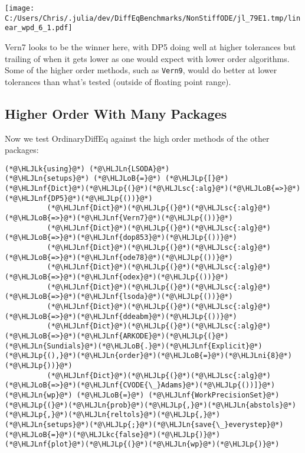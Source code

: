 \documentclass[12pt,a4paper]{article}
\newcommand{\HLJLk}[1]{\textcolor[RGB]{148,91,176}{\textbf{#1}}}
\newcommand{\HLJLkc}[1]{\textcolor[RGB]{59,151,46}{\textit{#1}}}
\newcommand{\HLJLn}[1]{#1}
\newcommand{\HLJLnf}[1]{\textcolor[RGB]{66,102,213}{#1}}
\newcommand{\HLJLsc}[1]{\textcolor[RGB]{201,61,57}{#1}}
\newcommand{\HLJLni}[1]{\textcolor[RGB]{59,151,46}{#1}}
\newcommand{\HLJLoB}[1]{\textcolor[RGB]{102,102,102}{\textbf{#1}}}
\newcommand{\HLJLp}[1]{#1}
\begin{document}
\texttt{[image: C:/Users/Chris/.julia/dev/DiffEqBenchmarks/NonStiffODE/jl\_79E1.tmp/linear\_wpd\_6\_1.pdf]}

Vern7 looks to be the winner here, with DP5 doing well at higher tolerances but trailing of when it gets lower as one would expect with lower order algorithms. Some of the higher order methods, such as \texttt{Vern9}, would do better at lower tolerances than what's tested (outside of floating point range).

\subsection{Higher Order With Many Packages}
Now we test OrdinaryDiffEq against the high order methods of the other packages:


\begin{lstlisting}
(*@\HLJLk{using}@*) (*@\HLJLn{LSODA}@*)
(*@\HLJLn{setups}@*) (*@\HLJLoB{=}@*) (*@\HLJLp{[}@*)(*@\HLJLnf{Dict}@*)(*@\HLJLp{(}@*)(*@\HLJLsc{:alg}@*)(*@\HLJLoB{=>}@*)(*@\HLJLnf{DP5}@*)(*@\HLJLp{())}@*)
          (*@\HLJLnf{Dict}@*)(*@\HLJLp{(}@*)(*@\HLJLsc{:alg}@*)(*@\HLJLoB{=>}@*)(*@\HLJLnf{Vern7}@*)(*@\HLJLp{())}@*)
          (*@\HLJLnf{Dict}@*)(*@\HLJLp{(}@*)(*@\HLJLsc{:alg}@*)(*@\HLJLoB{=>}@*)(*@\HLJLnf{dop853}@*)(*@\HLJLp{())}@*)
          (*@\HLJLnf{Dict}@*)(*@\HLJLp{(}@*)(*@\HLJLsc{:alg}@*)(*@\HLJLoB{=>}@*)(*@\HLJLnf{ode78}@*)(*@\HLJLp{())}@*)
          (*@\HLJLnf{Dict}@*)(*@\HLJLp{(}@*)(*@\HLJLsc{:alg}@*)(*@\HLJLoB{=>}@*)(*@\HLJLnf{odex}@*)(*@\HLJLp{())}@*)
          (*@\HLJLnf{Dict}@*)(*@\HLJLp{(}@*)(*@\HLJLsc{:alg}@*)(*@\HLJLoB{=>}@*)(*@\HLJLnf{lsoda}@*)(*@\HLJLp{())}@*)
          (*@\HLJLnf{Dict}@*)(*@\HLJLp{(}@*)(*@\HLJLsc{:alg}@*)(*@\HLJLoB{=>}@*)(*@\HLJLnf{ddeabm}@*)(*@\HLJLp{())}@*)
          (*@\HLJLnf{Dict}@*)(*@\HLJLp{(}@*)(*@\HLJLsc{:alg}@*)(*@\HLJLoB{=>}@*)(*@\HLJLnf{ARKODE}@*)(*@\HLJLp{(}@*)(*@\HLJLn{Sundials}@*)(*@\HLJLoB{.}@*)(*@\HLJLnf{Explicit}@*)(*@\HLJLp{(),}@*)(*@\HLJLn{order}@*)(*@\HLJLoB{=}@*)(*@\HLJLni{8}@*)(*@\HLJLp{))}@*)
          (*@\HLJLnf{Dict}@*)(*@\HLJLp{(}@*)(*@\HLJLsc{:alg}@*)(*@\HLJLoB{=>}@*)(*@\HLJLnf{CVODE{\_}Adams}@*)(*@\HLJLp{())]}@*)
(*@\HLJLn{wp}@*) (*@\HLJLoB{=}@*) (*@\HLJLnf{WorkPrecisionSet}@*)(*@\HLJLp{(}@*)(*@\HLJLn{prob}@*)(*@\HLJLp{,}@*)(*@\HLJLn{abstols}@*)(*@\HLJLp{,}@*)(*@\HLJLn{reltols}@*)(*@\HLJLp{,}@*)(*@\HLJLn{setups}@*)(*@\HLJLp{;}@*)(*@\HLJLn{save{\_}everystep}@*)(*@\HLJLoB{=}@*)(*@\HLJLkc{false}@*)(*@\HLJLp{)}@*)
(*@\HLJLnf{plot}@*)(*@\HLJLp{(}@*)(*@\HLJLn{wp}@*)(*@\HLJLp{)}@*)
\end{lstlisting}
\end{document}
